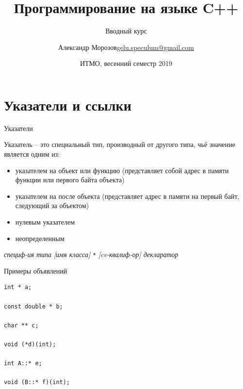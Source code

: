 \documentclass[unknownkeysallowed,xcolor=table]{beamer}
\title[C++]
{Программирование на языке C++}
\subtitle{Вводный курс}
\author[А.~Б.~Морозов]
{
  \texorpdfstring{Александр Морозов\newline\href{mailto:gelu.speculum@gmail.com}{gelu.speculum@gmail.com}}
  {Александр Морозов}
}
\date[ITMO 2019]
{ИТМО, весенний семестр 2019}
\begin{document}
\frame{\titlepage}


\section{Указатели и ссылки}

\begin{frame}[fragile]{Указатели}

Указатель -- это специальный тип, производный от другого типа, чьё значение является одним из:

\vspace{0.7em}

\begin{itemize}
  \item указателем на объект или функцию (представляет собой адрес в памяти функции или первого байта объекта) \vspace{0.5em}
  \item указателем на после объекта (представляет адрес в памяти на первый байт, следующий за объектом) \vspace{0.5em}
  \item нулевым указателем \vspace{0.5em}
  \item неопределенным
\end{itemize}

\vspace{1.5em}

\emph{специф-ия типа [имя класса]} \lstinline{*} \emph{[cv-квалиф-ор] декларатор} 

\end{frame}

\begin{frame}[fragile]{Примеры объявлений}

\begin{lstlisting}
int * a;

const double * b;

char ** c;

void (*d)(int);

int A::* e;

void (B::* f)(int);
\end{lstlisting}

\end{frame}
\end{document}
